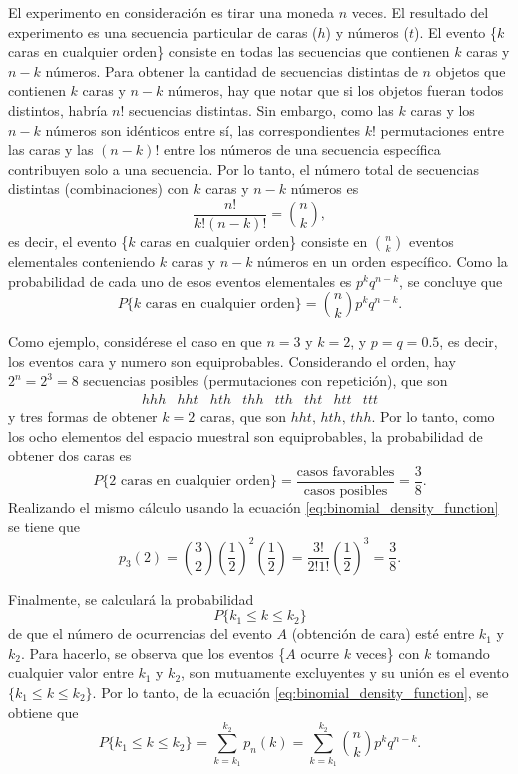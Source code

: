 \documentclass[a4paper]{report}
\begin{document}
El experimento en consideración es tirar una moneda \(n\) veces. El resultado del experimento es una secuencia particular de caras (\(h\)) y números (\(t\)). El evento \{\(k\) caras en cualquier orden\} consiste en todas las secuencias que contienen \(k\) caras y \(n-k\) números. Para obtener la cantidad de secuencias distintas de \(n\) objetos que contienen \(k\) caras y \(n-k\) números, hay que notar que si los objetos fueran todos distintos, habría \(n!\) secuencias distintas. Sin embargo, como las \(k\) caras y los \(n-k\) números son idénticos entre sí, las correspondientes \(k!\) permutaciones entre las caras y las \((n-k)!\) entre los números de una secuencia específica contribuyen solo a una secuencia. Por lo tanto, el número total de secuencias distintas (combinaciones) con \(k\) caras y \(n-k\) números es
\begin{equation}\label{eq:combinations_definition}
 \frac{n!}{k!(n-k)!}=\binom{n}{k},
\end{equation}
es decir, el evento \{\(k\) caras en cualquier orden\} consiste en \(\binom{n}{k}\) eventos elementales conteniendo \(k\) caras y \(n-k\) números en un orden específico. Como la probabilidad de cada uno de esos eventos elementales es \(p^{k}q^{n-k}\), se concluye que
\[
 P\{k\textrm{ caras en cualquier orden}\}=\binom{n}{k}p^{k}q^{n-k}.
\]

Como ejemplo, considérese el caso en que \(n=3\) y \(k=2\), y \(p=q=0.5\), es decir, los eventos cara y numero son equiprobables. Considerando el orden, hay \(2^n=2^3=8\) secuencias posibles (permutaciones con repetición), que son
\[
 \begin{array}{llllllll}
  hhh & hht & hth & thh & tth & tht & htt & ttt
 \end{array}
\]
y tres formas de obtener \(k=2\) caras, que son \( hht,\,hth,\,thh\). Por lo tanto, como los ocho elementos del espacio muestral son equiprobables, la probabilidad de obtener dos caras es
\[
 P\{2\textrm{ caras en cualquier orden}\}=\frac{\textrm{casos favorables}}{\textrm{casos posibles}}=\frac{3}{8}.
\]
Realizando el mismo cálculo usando la ecuación \ref{eq:binomial_density_function} se tiene que
\[
 p_3(2)=\binom{3}{2}\left(\frac{1}{2}\right)^2\left(\frac{1}{2}\right)=\frac{3!}{2!1!}\left(\frac{1}{2}\right)^3=\frac{3}{8}.
\]

Finalmente, se calculará la probabilidad 
\[
 P\{k_1\leq k\leq k_2\}
\]
de que el número de ocurrencias del evento \(A\) (obtención de cara) esté entre \(k_1\) y \(k_2\). Para hacerlo, se observa que los eventos \{\(A\) ocurre \(k\) veces\} con \(k\) tomando cualquier valor entre \(k_1\) y \(k_2\), son mutuamente excluyentes y su unión es el evento \(\{k_1\leq k\leq k_2\}\). Por lo tanto, de la ecuación \ref{eq:binomial_density_function}, se obtiene que
\begin{equation}\label{eq:binomial_interval_probability}
 P\{k_1\leq k\leq k_2\}=\sum_{k=k_1}^{k_2}p_n(k)=\sum_{k=k_1}^{k_2}\binom{n}{k}p^kq^{n-k}.
\end{equation}
\end{document}
